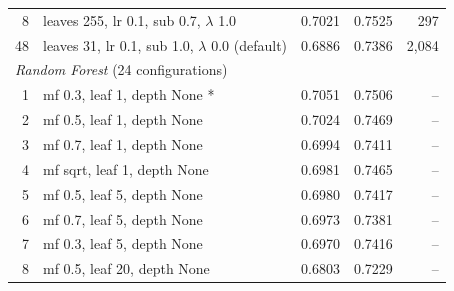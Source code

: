 \begin{tabular}{rlrrr}
8 & leaves 255, lr 0.1, sub 0.7, $\lambda$ 1.0 & 0.7021 & 0.7525 & 297 \\
48 & leaves 31, lr 0.1, sub 1.0, $\lambda$ 0.0 (default) & 0.6886 & 0.7386 & 2,084 \\
\midrule
\multicolumn{5}{l}{\emph{Random Forest} (24 configurations)} \\
1 & mf 0.3, leaf 1, depth None * & 0.7051 & 0.7506 & -- \\
2 & mf 0.5, leaf 1, depth None & 0.7024 & 0.7469 & -- \\
3 & mf 0.7, leaf 1, depth None & 0.6994 & 0.7411 & -- \\
4 & mf sqrt, leaf 1, depth None & 0.6981 & 0.7465 & -- \\
5 & mf 0.5, leaf 5, depth None & 0.6980 & 0.7417 & -- \\
6 & mf 0.7, leaf 5, depth None & 0.6973 & 0.7381 & -- \\
7 & mf 0.3, leaf 5, depth None & 0.6970 & 0.7416 & -- \\
8 & mf 0.5, leaf 20, depth None & 0.6803 & 0.7229 & -- \\
\bottomrule
\end{tabular}
